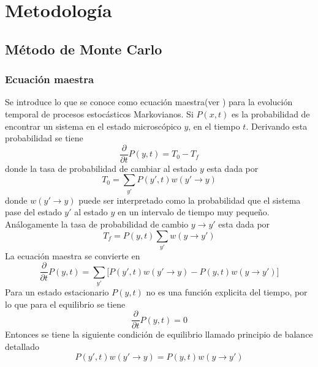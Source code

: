 \documentclass[a4paper]{article}
\begin{document}
\section{Metodología}
\subsection{Método de Monte Carlo}
\subsubsection{Ecuación maestra}
Se introduce lo que se conoce como ecuación maestra(ver \cite{Silvio}) para la evolución temporal de procesos estocásticos Markovianos. Si $P(x,t)$ es la probabilidad de encontrar un sistema en el estado microscópico $y$, en el tiempo $t$. Derivando esta probabilidad se tiene
\begin{equation}
\frac{\partial}{\partial t}P(y,t)=T_0-T_f
\end{equation}
donde la tasa de probabilidad de cambiar al estado $y$ esta dada por
\begin{equation}
T_0=\sum_{y'}P(y',t)w(y'\rightarrow y)
\end{equation}
donde $w(y'\rightarrow y)$ puede ser interpretado como la probabilidad que el sistema pase del estado $y'$ al estado $y$ en un intervalo de tiempo muy pequeño. Análogamente la tasa de probabilidad de cambio $y\rightarrow y'$ esta dada por
\begin{equation}
T_f=P(y,t)\sum_{y'}w(y\rightarrow y')
\end{equation}
La ecuación maestra se convierte en 
\begin{equation}\label{masterEq}
\frac{\partial}{\partial t}P(y,t)=\sum_{y'}\Big[P(y',t)w(y'\rightarrow y)-P(y,t)w(y\rightarrow y')\Big]
\end{equation}
Para un estado estacionario $P(y,t)$ no es una función explicita del tiempo, por lo que para el equilibrio se tiene
\begin{equation}
\frac{\partial}{\partial t}P(y,t)=0
\end{equation}
Entonces se tiene la siguiente condición de equilibrio llamado principio de balance detallado
\begin{equation}\label{equi}
P(y',t)w(y'\rightarrow y)=P(y,t)w(y\rightarrow y')
\end{equation}
\end{document}
